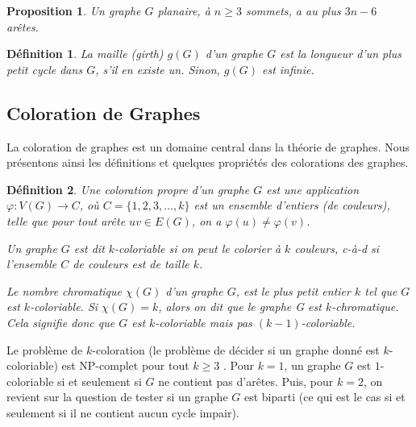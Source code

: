 \documentclass[10pt,a4paper]{article}
\newtheorem{definition}{Définition}
\newtheorem{proposition}{Proposition}
\newtheorem{exemple}{Exemple}
\begin{document}
\begin{proposition}
Un graphe $G$ planaire, à $n \geq 3$ sommets, a au plus $3n - 6$ arêtes.
\end{proposition}

\begin{definition}
La \emph{maille (girth)} $g(G)$ d'un graphe $G$ est la longueur d'un plus petit cycle dans $G$, s'il en existe un. Sinon, $g(G)$ est infinie. %
\end{definition}

\subsection{Coloration de Graphes}
La coloration de graphes est un domaine central dans la théorie de graphes. 
Nous présentons ainsi les définitions et quelques propriétés des colorations des graphes.


\begin{definition}%
Une \emph{coloration propre} d'un graphe $G$ est une application $\varphi: V(G) \to C$, où $C=\{1,2,3,\dots,k\}$ est un ensemble d'entiers (de \emph{couleurs}), telle que pour tout arête $uv \in E(G)$, on a $\varphi(u) \neq \varphi(v)$. 

Un graphe $G$ est dit \emph{$k$-coloriable} si on peut le colorier à $k$ couleurs, c-à-d si l'ensemble $C$ de couleurs est de taille $k$. 

Le \emph{nombre chromatique} $\chi(G)$ d'un graphe $G$, est le plus petit entier $k$ tel que $G$ est $k$-coloriable. Si $\chi(G) = k$, alors on dit que le graphe G est \emph{$k$-chromatique}. Cela signifie donc que $G$ est $k$-coloriable mais  pas $(k-1)$-coloriable.
\end{definition}




Le problème de $k$-coloration (le problème de décider si un graphe donné est $k$-coloriable) est NP-complet pour tout $k \geq 3$ \cite{NP}. Pour $k = 1$, un graphe $G$ est $1$-coloriable si et seulement si $G$ ne contient pas d'arêtes. Puis, pour $k =  2$, on revient sur la question de tester si un graphe $G$ est biparti (ce qui est le cas si et seulement si il ne contient aucun cycle impair). 
\end{document}
